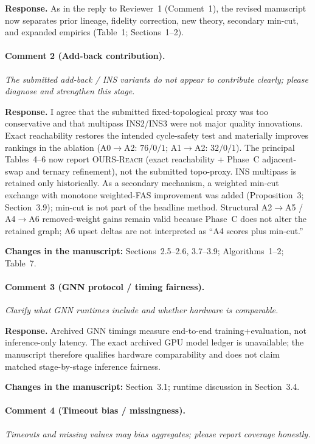 \documentclass[11pt]{article}
\newcommand{\commentbox}[1]{\par\textit{#1}\par\medskip}
\newcommand{\changes}[1]{\textbf{Changes in the manuscript:} #1\par\medskip}
\begin{document}
\noindent\textbf{Response.}
As in the reply to Reviewer~1 (Comment~1), the revised manuscript now separates prior lineage, fidelity correction, new theory, secondary min-cut, and expanded empirics (Table~1; Sections~1--2).

\paragraph{Comment 2 (Add-back contribution).}
\commentbox{The submitted add-back / INS variants do not appear to contribute clearly; please diagnose and strengthen this stage.}

\noindent\textbf{Response.}
I agree that the submitted fixed-topological proxy was too conservative and that multipass INS2/INS3 were not major quality innovations. Exact reachability restores the intended cycle-safety test and materially improves rankings in the ablation (A0$\to$A2: $76/0/1$; A1$\to$A2: $32/0/1$). The principal Tables~4--6 now report \textsc{OURS-Reach} (exact reachability + Phase~C adjacent-swap and ternary refinement), not the submitted topo-proxy. INS multipass is retained only historically. As a secondary mechanism, a weighted min-cut exchange with monotone weighted-FAS improvement was added (Proposition~3; Section~3.9); min-cut is not part of the headline method. Structural A2$\to$A5 / A4$\to$A6 removed-weight gains remain valid because Phase~C does not alter the retained graph; A6 upset deltas are not interpreted as ``A4 scores plus min-cut.''

\changes{Sections~2.5--2.6, 3.7--3.9; Algorithms~1--2; Table~7.}

\paragraph{Comment 3 (GNN protocol / timing fairness).}
\commentbox{Clarify what GNN runtimes include and whether hardware is comparable.}

\noindent\textbf{Response.}
Archived GNN timings measure end-to-end training+evaluation, not inference-only latency. The exact archived GPU model ledger is unavailable; the manuscript therefore qualifies hardware comparability and does not claim matched stage-by-stage inference fairness.

\changes{Section~3.1; runtime discussion in Section~3.4.}

\paragraph{Comment 4 (Timeout bias / missingness).}
\commentbox{Timeouts and missing values may bias aggregates; please report coverage honestly.}
\end{document}
